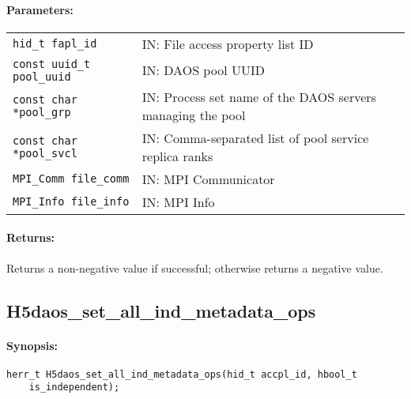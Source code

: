 \documentclass[../users_guide.tex]{subfiles}
\begin{document}
\paragraph{Parameters:}
\begin{flushleft}%
 \begin{tabular}{ll}%
   \texttt{hid\_t fapl\_id} & IN: File access property list ID \\
   \texttt{const uuid\_t pool\_uuid} & IN: DAOS pool UUID \\
   \texttt{const char *pool\_grp} & IN: Process set name of the DAOS servers managing the pool \\
   \texttt{const char *pool\_svcl} & IN: Comma-separated list of pool service replica ranks \\
   \texttt{MPI\_Comm file\_comm} & IN: MPI Communicator \\
   \texttt{MPI\_Info file\_info} & IN: MPI Info \\
 \end{tabular}%
\end{flushleft}%

\paragraph{Returns:}
\begin{flushleft}%
Returns a non-negative value if successful; otherwise returns a negative value.
\end{flushleft}%

\newpage
\subsection{H5daos\_set\_all\_ind\_metadata\_ops}
\label{ref:h5daos_set_all_ind_metadata_ops}

\paragraph{Synopsis:}
\begin{flushleft}%
\begin{verbatim}
herr_t H5daos_set_all_ind_metadata_ops(hid_t accpl_id, hbool_t
    is_independent);
\end{verbatim}
\end{flushleft}%
\end{document}
